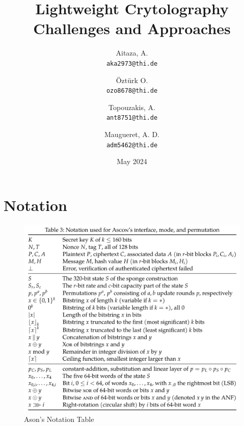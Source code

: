 \documentclass{article}
\date{May 2024}
\title{Lightweight Crytolography Challenges and Approaches}
\author{
  Aitaza, A. \\
  \texttt{aka2973@thi.de}
  \and
  Öztürk O.\\
  \texttt{ozo8678@thi.de}   
  \and
  Topouzakis, A. \\
  \texttt{ant8751@thi.de}
  \and
  Maugueret, A. D.\\
  \texttt{adm5462@thi.de}
  }
\begin{document}
\maketitle

\newpage
\tableofcontents
\newpage

\section{Notation}

\begin{figure}[H] 
    \centering 
    \includegraphics[width=1\textwidth]{figures/ascon-notation.png}
    \caption{Ason's Notation Table \cite{Ascon-v1.2}}
    \label{fig:ascon-notation} 
  \end{figure}








\printbibliography
\end{document}
